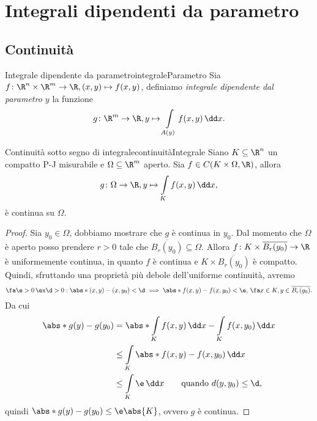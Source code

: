 %
%
\chapter{Integrali dipendenti da parametro}
\section{Continuità}

\begin{defn}{Integrale dipendente da parametro}{integraleParametro}
	Sia \(f\colon \R^n \times \R^m \to \R,(x,y)\mapsto f(x,y)\), definiamo \emph{integrale dipendente dal parametro \(y\)} la funzione
	\[
		g\colon \R^m \to \R, y \mapsto \int\limits_{A(y)} f(x,y)\,\dd x.
	\]
\end{defn}

\begin{teor}{Continuità sotto segno di integrale}{continuitàIntegrale}
	Siano \(K\subseteq \R^n\) un compatto P-J misurabile e \(\Omega \subseteq \R^m\) aperto.
	Sia \(f\in C(K\times \Omega, \R)\), allora
	\[
		g\colon \Omega \to \R, y \mapsto \int\limits_K f(x,y)\,\dd x,
	\]
	è continua su \(\Omega\).
\end{teor}

\begin{proof}
	Sia \(y_0\in \Omega\), dobbiamo mostrare che \(g\) è continua in \(y_0\).
	Dal momento che \(\Omega\) è aperto posso prendere \(r>0\) tale che \(\overline{B_r(y_0)}\subseteq \Omega\).
	Allora \(f\colon K\times \overline{B_r(y_0)}\to \R\) è uniformemente continua, in quanto \(f\) è continua e \(K\times \overline{B_r(y_0)}\) è compatto.
	Quindi, sfruttando una proprietà più debole dell'uniforme continuità, avremo
	\[
		\fa\e>0\,\ex\d>0 : \abs*{(x,y)-(x,y_0)}<\d \implies \abs*{f(x,y)-f(x,y_0)}<\e,\,\fa x\in K,y \in \overline{B_r(y_0)}.
	\]
	Da cui
	\[
		\begin{split}
			\abs*{g(y)-g(y_0)} & = \abs*{\int\limits_K f(x,y)\,\dd x-\int\limits_K f(x,y_0)\,\dd x}\\
			& \le \int\limits_K \abs*{f(x,y)-f(x,y_0)}\,\dd x\\
			& \le \int\limits_K \e\,\dd x \qquad\text{quando }d(y,y_0)\le\d,
		\end{split}
	\]
	quindi \(\abs*{g(y)-g(y_0)}\le \e\abs{K}\), ovvero \(g\) è continua.
\end{proof}

